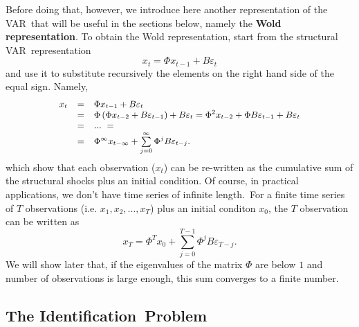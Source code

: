 \documentclass[10pt]{article}
\begin{document}
Before doing that, however, we introduce here another representation of the
VAR\ that will be useful in the sections below, namely the \textbf{Wold
representation}. To obtain the Wold representation, start from the
structural VAR\ representation
\begin{equation}
x_{t}=\Phi x_{t-1}+B\varepsilon _{t}  \label{eq:struct_var_4}
\end{equation}%
and use it to substitute recursively the elements on the right hand side of
the equal sign. Namely,
\begin{equation}
{\small
\begin{array}{lll}
x_{t} & = & \Phi x_{t-1}+B\varepsilon _{t} \\
& = & \Phi \left( \Phi x_{t-2}+B\varepsilon _{t-1}\right) +B\varepsilon
_{t}=\Phi ^{2}x_{t-2}+\Phi B\varepsilon _{t-1}+B\varepsilon _{t} \\
& = & ...\ = \\
& = & \Phi ^{\infty }x_{t-\infty }+\sum\limits_{j=0}^{\infty }\Phi
^{j}B\varepsilon _{t-j}.%
\end{array}%
}  \label{eq:struct_wold}
\end{equation}%
which show that each observation ($x_{t}$) can be re-written as the
cumulative sum of the structural shocks plus an initial condition. Of
course, in practical applications, we don't have time series of infinite
length.\ For a finite time series of $T$ observations (i.e. $%
x_{1},x_{2},...,x_{T}$) plus an initial conditon $x_{0}$, the $T$
observation can be written as%
\begin{equation}
x_{T}=\Phi ^{T}x_{0}+\sum\limits_{j=0}^{T-1}\Phi ^{j}B\varepsilon _{T-j}.
\label{eq:struct_wold_1}
\end{equation}%
We will show later that, if the eigenvalues of the matrix $\Phi $ are below $%
1$ and number of observations is large enough, this sum converges to a
finite number.

\subsection{The Identification\ Problem}
\end{document}
